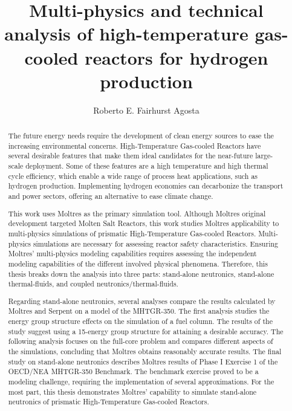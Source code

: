 \documentclass[edeposit,fullpage]{uiucthesis2018}
\title{Multi-physics and technical analysis of high-temperature gas-cooled reactors for hydrogen production}
\author{Roberto E. Fairhurst Agosta}
\begin{document}
\maketitle

\frontmatter
\begin{abstract}

The future energy needs require the development of clean energy sources to ease the increasing environmental concerns.
High-Temperature Gas-cooled Reactors have several desirable features that make them ideal candidates for the near-future large-scale deployment.
Some of these features are a high temperature and high thermal cycle efficiency, which enable a wide range of process heat applications, such as hydrogen production.
Implementing hydrogen economies can decarbonize the transport and power sectors, offering an alternative to ease climate change.

This work uses Moltres as the primary simulation tool.
Although Moltres original development targeted Molten Salt Reactors, this work studies Moltres applicability to multi-physics simulations of prismatic High-Temperature Gas-cooled Reactors.
Multi-physics simulations are necessary for assessing reactor safety characteristics.
Ensuring Moltres' multi-physics modeling capabilities requires assessing the independent modeling capabilities of the different involved physical phenomena.
Therefore, this thesis breaks down the analysis into three parts: stand-alone neutronics, stand-alone thermal-fluids, and coupled neutronics/thermal-fluids.

Regarding stand-alone neutronics, several analyses compare the results calculated by Moltres and Serpent on a model of the MHTGR-350.
The first analysis studies the energy group structure effects on the simulation of a fuel column.
The results of the study suggest using a 15-energy group structure for attaining a desirable accuracy.
The following analysis focuses on the full-core problem and compares different aspects of the simulations, concluding that Moltres obtains reasonably accurate results.
The final study on stand-alone neutronics describes Moltres results of Phase I Exercise 1 of the OECD/NEA MHTGR-350 Benchmark.
The benchmark exercise proved to be a modeling challenge, requiring the implementation of several approximations.
For the most part, this thesis demonstrates Moltres' capability to simulate stand-alone neutronics of prismatic High-Temperature Gas-cooled Reactors.


\end{abstract}
\end{document}
